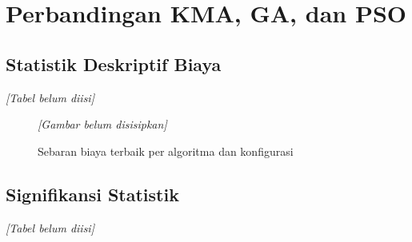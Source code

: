     \section{Perbandingan KMA, GA, dan PSO}\label{sec:algorithm comparison}

        \subsection{Statistik Deskriptif Biaya}\label{subsec:descriptive}

        \begin{table}[H]
            \centering
            \caption{Statistik deskriptif biaya terbaik 30 replikasi per algoritma (bank latih)}\label{tab:descriptive stats}
            \textit{[Tabel belum diisi]}
        \end{table}

        \begin{figure}[H]
            \centering
            \textit{[Gambar belum disisipkan]}
            \caption{Sebaran biaya terbaik per algoritma dan konfigurasi}\label{fig:boxplot cost}
        \end{figure}

        \subsection{Signifikansi Statistik}\label{subsec:statistical significance}

        \begin{table}[H]
            \centering
            \caption{Uji Kruskal–Wallis dan ukuran efek $\epsilon^2$}\label{tab:kruskal wallis}
            \textit{[Tabel belum diisi]}
        \end{table}

